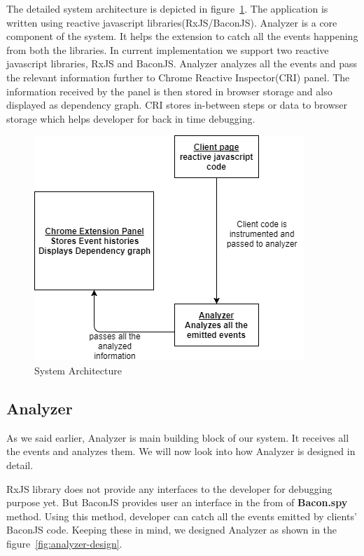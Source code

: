 The detailed system architecture is depicted in figure~\ref{fig:system-architecture}. The application is written using reactive javascript libraries(RxJS/BaconJS). Analyzer is a core component of the system. It helps the extension to catch all the events happening from both the libraries. In current implementation we support two reactive javascript libraries, RxJS and BaconJS. Analyzer analyzes all the events and pass the relevant information further to Chrome Reactive Inspector(CRI) panel. The information received by the panel is then stored in browser storage and also displayed as dependency graph. CRI stores in-between steps or data to browser storage which helps developer for back in time debugging.

\begin{figure}[!h]
	\centering
	\includegraphics[scale=0.5,trim=0 0 0 0]{images/system-architecture.png}
	\caption{System Architecture}
	\label{fig:system-architecture}
\end{figure}

\subsection{Analyzer}
As we said earlier, Analyzer is main building block of our system. It receives all the events and analyzes them. We will now look into how Analyzer is designed in detail.

RxJS library does not provide any interfaces to the developer for debugging purpose yet. But BaconJS provides user an interface in the from of \textbf{Bacon.spy} method. Using this method, developer can catch all the events emitted by clients' BaconJS code. Keeping these in mind, we designed Analyzer as shown in the figure~\ref{fig:analyzer-design}. 

